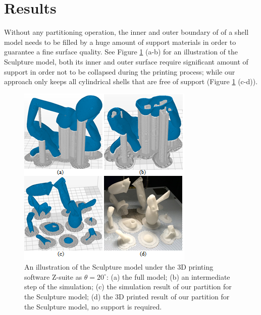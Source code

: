 \section{Results}

Without any partitioning operation, the inner and outer boundary of of a shell model needs to be filled by a huge amount of support materials in order to guarantee a fine surface quality. See Figure \ref{fig:dear-simulation} (a-b) for an illustration of the Sculpture model, both its inner and outer surface require significant amount of support in order not to be collapsed during the printing process; while our approach only keeps all cylindrical shells that are free of support (Figure \ref{fig:dear-simulation} (c-d)).

\begin{figure}[tbp]
  \centering
  \includegraphics[width=\linewidth]{figs/dear-simulation.png}
  \caption{\label{fig:dear-simulation}%
           An illustration of the Sculpture model under the 3D printing software Z-suite as $\theta = 20^{\circ}$: (a) the full model; (b) an intermediate step of the simulation; (c) the simulation result of our partition for the Sculpture model; (d) the 3D printed result of our partition for the Sculpture model, no support is required.}
\end{figure}


